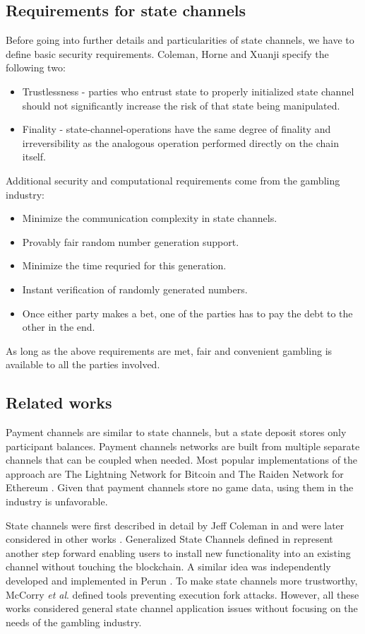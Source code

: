 		\subsection {Requirements for state channels}
	Before going into further details and particularities of state channels, we have to define basic security requirements. Coleman, Horne and Xuanji \cite{bib1} specify the following two:
	\begin{itemize}
		\item Trustlessness - parties who entrust state to properly initialized state channel should not significantly increase the risk of that state being manipulated. 
		\item Finality - state-channel-operations have the same degree of finality and irreversibility as the analogous operation performed directly on the chain itself.
	\end{itemize}
	Additional security and computational requirements come from the gambling industry:
	\begin{itemize}
		\item Minimize the communication complexity in state channels.
		\item Provably fair random number generation support.
		\item Minimize the time requried for this generation.
		\item Instant verification of randomly generated numbers.
		\item Once either party makes a bet, one of the parties has to pay the debt to the other in the end. 
	\end{itemize}

	As long as the above requirements are met, fair and convenient gambling is available to all the parties involved.

		\subsection {Related works} 
	Payment channels \cite{bib11} are similar to state channels, but a state deposit stores only participant balances. Payment channels networks are built from multiple separate channels that can be coupled when needed. Most popular implementations of the approach are The Lightning Network for Bitcoin \cite{bib24} and The Raiden Network for Ethereum \cite{bib25}. Given that payment channels store no game data, using them in the industry is unfavorable. 

	State channels were first described in detail by Jeff Coleman in \cite{bib5} and were later considered in other works \cite{bib6, bib7, bib8}. Generalized State Channels defined in \cite{bib1} represent another step forward enabling users to install new functionality into an existing channel without touching the blockchain. A similar idea was independently developed and implemented in Perun \cite{bib14}. To make state channels more trustworthy, McCorry \textit {et al}. \cite{bib9} defined tools preventing execution fork attacks. However, all these works considered general state channel application issues without focusing on the needs of the gambling industry.

